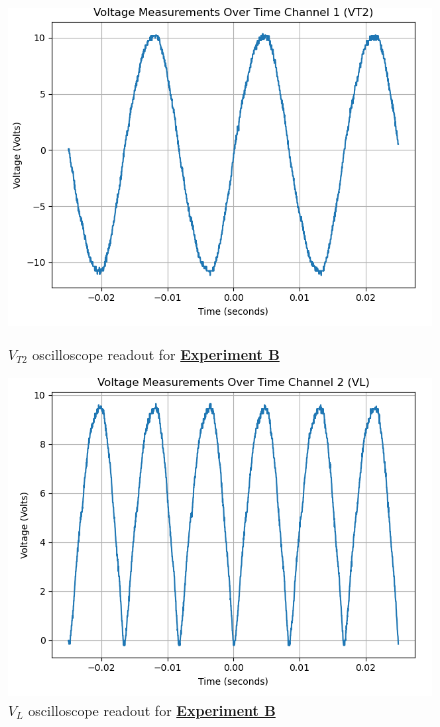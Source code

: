 \documentclass[
	letterpaper
	12pt
]{template}
\newcommand{\bref}[2]{\textbf{\hyperref[#1]{#2}}}
\begin{document}
\begin{figure}[H]\label{data::B2}
	\centering
	\begin{minipage}[c]{0.45\textwidth}
		\centering
		\includegraphics[width=\textwidth]{figures/B/2--ch1.png}
		\caption{$V_{T2}$ oscilloscope readout for \bref{exp::B}{Experiment B}}
	\end{minipage}
	\hfill
	\begin{minipage}[c]{0.45\textwidth}
		\centering
		\includegraphics[width=\textwidth]{figures/B/2--ch2.png}
		\caption{$V_{L}$ oscilloscope readout for \bref{exp::B}{Experiment B}}
	\end{minipage}
\end{figure}
\end{document}
